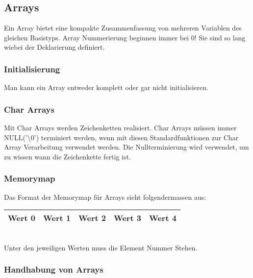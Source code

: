 \subsection{Arrays}

Ein Array bietet eine kompakte Zusammenfassung von mehreren Variablen des gleichen Basistyps. 
Array Nummerierung beginnen immer bei 0! 
Sie sind so lang wiebei der Deklarierung definiert. 



\subsubsection{Initialisierung}

Man kann ein Array entweder komplett oder gar nicht initialisieren.



\subsubsection{Char Arrays}

Mit Char Arrays werden Zeichenketten realisiert. Char Arrays müssen immer NULL('\textbackslash 0') terminiert werden, wenn mit diesen Standardfunktionen zur Char Array Verarbeitung verwendet werden. Die Nullterminierung wird verwendet, um zu wissen wann die Zeichenkette fertig ist.



\subsubsection{Memorymap}

Das Format der Memorymap für Arrays sieht folgendermassen aus:\\

\begin{tabular}{|c|c|c|c|c|}
\hline
Wert 0&Wert 1& Wert 2& Wert 3&Wert 4\\ \hline
\end{tabular}
\\

Unter den jeweiligen Werten muss die Element Nummer Stehen.

\nextcol

\subsubsection{Handhabung von Arrays}

